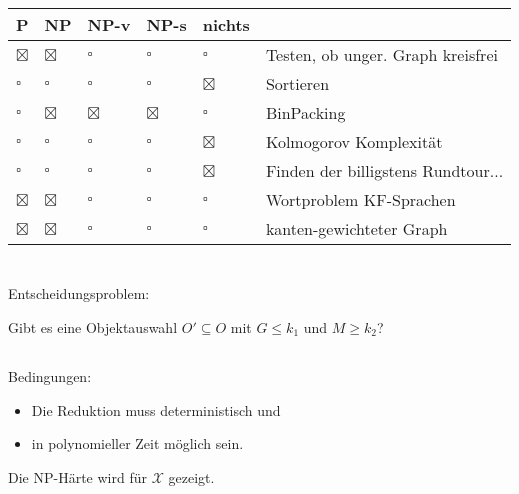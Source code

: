 \documentclass{article}
\begin{document}
\section{}
\begin{center}
\begin{tabularx}{\textwidth}{lllll|X}
P & NP & NP-v & NP-s & nichts & \\
\hline
$\boxtimes$ & $\boxtimes$ & $\square$ & $\square$ & $\square$ & Testen, ob unger. Graph kreisfrei \\
$\square$ & $\square$ & $\square$ & $\square$ & $\boxtimes$ & Sortieren\\
$\square$ & $\boxtimes$ & $\boxtimes$ & $\boxtimes$ & $\square$ & BinPacking\\
$\square$ & $\square$ & $\square$ & $\square$ & $\boxtimes$ & Kolmogorov Komplexität\\
$\square$ & $\square$ & $\square$ & $\square$ & $\boxtimes$ & Finden der billigstens Rundtour...\\
$\boxtimes$ & $\boxtimes$ & $\square$ & $\square$ & $\square$ & Wortproblem KF-Sprachen \\
$\boxtimes$ & $\boxtimes$ & $\square$ & $\square$ & $\square$ & kanten-gewichteter Graph \\
\end{tabularx}
\end{center}

\section{}
\subsection{}
Entscheidungsproblem:

Gibt es eine Objektauswahl $O'\subseteq O$ mit $G \leq k_1$ und $M \geq k_2$?

\subsection{}
Bedingungen:
\begin{itemize}
  \item Die Reduktion muss deterministisch und
  \item in polynomieller Zeit möglich sein.
\end{itemize}
Die NP-Härte wird für $\mathcal{X}$ gezeigt.
\end{document}
